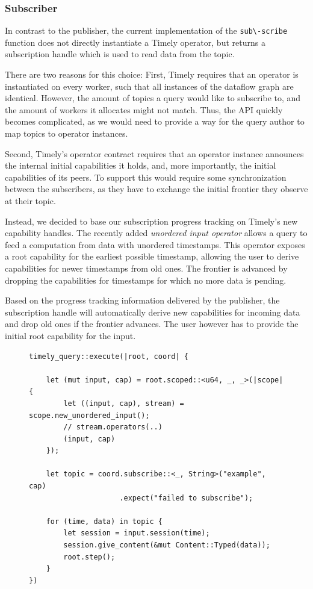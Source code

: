 \subsubsection{Subscriber}

In contrast to the publisher, the current implementation of the \lstinline{sub\-scribe}
function does not directly instantiate a Timely operator, but returns a subscription
handle which is used to read data from the topic.

There are two reasons for this choice: First, Timely requires that an operator
is instantiated on every worker, such that all instances of the dataflow graph
are identical. However, the amount of topics a query would like to subscribe
to, and the amount of workers it allocates might not match. Thus, the API
quickly becomes complicated, as we would need to provide a way for the 
query author to map topics to operator instances.

Second, Timely's operator contract requires that an operator instance announces
the internal initial capabilities it holds, and, more importantly, the initial
capabilities of its peers. To support this would require some synchronization
between the subscribers, as they have to exchange the initial frontier they
observe at their topic.

Instead, we decided to base our subscription progress tracking on Timely's new
capability handles. The recently added \emph{unordered input operator} allows
a query to feed a computation from data with unordered timestamps. This operator
exposes a root capability for the earliest possible timestamp, allowing the user
to derive capabilities for newer timestamps from old ones. The frontier
is advanced by dropping the capabilities for timestamps for which no more data
is pending.

Based on the progress tracking information delivered by the publisher, the
subscription handle will automatically derive new capabilities for incoming
data and drop old ones if the frontier advances. The user however has to
provide the initial root capability for the input.

\begin{figure}[htb]
\begin{lstlisting}[caption={[Typical use of the subscription handle]
Typical use of the subscription handle. This query subscribes to a single topic of
strings, with \lstinline{u64} being the type of the timestamps.
},label={lst:subhandle}]
timely_query::execute(|root, coord| {

    let (mut input, cap) = root.scoped::<u64, _, _>(|scope| {
        let ((input, cap), stream) = scope.new_unordered_input();
        // stream.operators(..)
        (input, cap)
    });

    let topic = coord.subscribe::<_, String>("example", cap)
                     .expect("failed to subscribe");

    for (time, data) in topic {
        let session = input.session(time);
        session.give_content(&mut Content::Typed(data));
        root.step();
    }
})
\end{lstlisting}
\end{figure}

